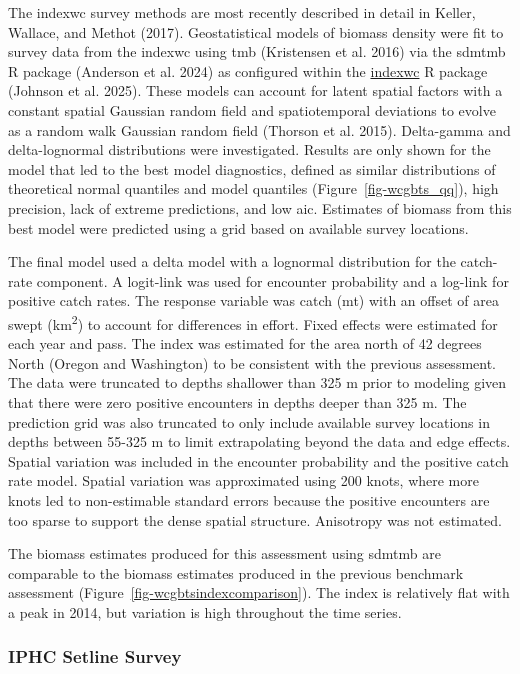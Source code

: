 \documentclass[
]{scrartcl}
\begin{document}
The \gls{indexwc} survey methods are most recently described in detail
in Keller, Wallace, and Methot (2017). Geostatistical models of biomass
density were fit to survey data from the \gls{indexwc} using \gls{tmb}
(Kristensen et al. 2016) via the \gls{sdmtmb} R package (Anderson et al.
2024) as configured within the
\href{https://github.com/pfmc-assessments/indexwc}{indexwc} R package
(Johnson et al. 2025). These models can account for latent spatial
factors with a constant spatial Gaussian random field and spatiotemporal
deviations to evolve as a random walk Gaussian random field (Thorson et
al. 2015). Delta-gamma and delta-lognormal distributions were
investigated. Results are only shown for the model that led to the best
model diagnostics, defined as similar distributions of theoretical
normal quantiles and model quantiles (Figure~\ref{fig-wcgbts_qq}), high
precision, lack of extreme predictions, and low \gls{aic}. Estimates of
biomass from this best model were predicted using a grid based on
available survey locations.

The final model used a delta model with a lognormal distribution for the
catch-rate component. A logit-link was used for encounter probability
and a log-link for positive catch rates. The response variable was catch
(mt) with an offset of area swept (km\textsuperscript{2}) to account for
differences in effort. Fixed effects were estimated for each year and
pass. The index was estimated for the area north of 42 degrees North
(Oregon and Washington) to be consistent with the previous assessment.
The data were truncated to depths shallower than 325 m prior to modeling
given that there were zero positive encounters in depths deeper than 325
m. The prediction grid was also truncated to only include available
survey locations in depths between 55-325 m to limit extrapolating
beyond the data and edge effects. Spatial variation was included in the
encounter probability and the positive catch rate model. Spatial
variation was approximated using 200 knots, where more knots led to
non-estimable standard errors because the positive encounters are too
sparse to support the dense spatial structure. Anisotropy was not
estimated.

The biomass estimates produced for this assessment using \gls{sdmtmb}
are comparable to the biomass estimates produced in the previous
benchmark assessment (Figure~\ref{fig-wcgbtsindexcomparison}). The index
is relatively flat with a peak in 2014, but variation is high throughout
the time series.

\subsubsection{IPHC Setline Survey}\label{iphc-setline-survey}
\end{document}
